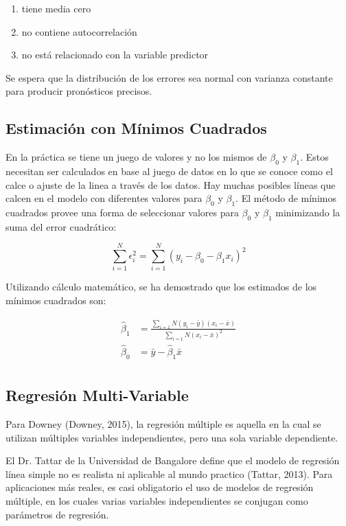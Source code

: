 \begin{spacing}{1.5}
\begin{enumerate}
  \item tiene media cero
  \item no contiene autocorrelación
  \item no está relacionado con la variable predictor
\end{enumerate}

Se espera que la distribución de los errores sea normal con varianza constante para producir pronósticos precisos. 

\subsection{Estimación con Mínimos Cuadrados}
En la práctica se tiene un juego de valores y no los mismos de $\beta_{0}$ y $\beta_{1}$. Estos necesitan ser calculados en base al juego de datos en lo que se conoce como el calce o ajuste de la linea a través de los datos. Hay muchas posibles líneas que calcen en el modelo con diferentes valores para $\beta_{0}$ y $\beta_{1}$. El método de mínimos cuadrados provee una forma de seleccionar valores para $\beta_{0}$ y $\beta_{1}$ minimizando la suma del error cuadrático:

\[ \sum_{i=1}^{N} \epsilon_{i}^{2} = \sum_{i=1}^{N}(y_{i} - \beta_{0} - \beta_{1}x_{i})^2 \]

Utilizando cálculo matemático, se ha demostrado que los estimados de los mínimos cuadrados son:

\begin{equation}
\begin{split}
	\hat{\beta}_{1} &= \frac{\sum_{i=1}{N}(y_{i}-\bar{y})(x_{i} - \bar{x})}{\sum_{i=1}{N}(x_{i}-\bar{x})^2}\\
	\hat{\beta}_{0} &= \bar{y} - \hat{\beta}_{1} \bar{x}\\
\end{split}
\end{equation}

\subsection{Regresión Multi-Variable}
Para Downey (Downey, 2015), la regresión múltiple es aquella en la cual se utilizan múltiples variables independientes, pero una sola variable dependiente. 

El Dr. Tattar de la Universidad de Bangalore define que el modelo de regresión línea simple no es realista ni aplicable al mundo practico (Tattar, 2013). Para aplicaciones más reales, es casi obligatorio el uso de modelos de regresión múltiple, en los cuales varias variables independientes se conjugan como parámetros de regresión. 


\end{spacing}
